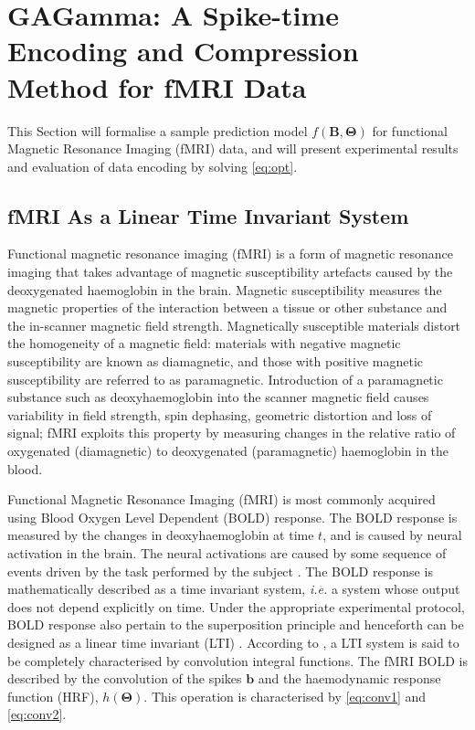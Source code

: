 \section{GAGamma: A Spike-time Encoding and Compression Method for fMRI Data}
\label{sec:fmri}

This Section will formalise a sample prediction model $f(\mathbf{B, \Theta})$ for functional Magnetic Resonance Imaging (fMRI) data, and will present experimental results and evaluation of data encoding by solving \equationname \ref{eq:opt}.

\subsection{fMRI As a Linear Time Invariant System}

Functional magnetic resonance imaging (fMRI) is a form of magnetic resonance imaging that takes advantage of magnetic susceptibility artefacts caused by the deoxygenated haemoglobin in the brain. Magnetic susceptibility measures the magnetic properties of the interaction between a tissue or other substance and the in-scanner magnetic field strength. Magnetically susceptible materials distort the homogeneity of a magnetic field: materials with negative magnetic susceptibility are known as diamagnetic, and those with positive magnetic susceptibility are referred to as paramagnetic. Introduction of a paramagnetic substance such as deoxyhaemoglobin into the scanner magnetic field causes variability in field strength, spin dephasing, geometric distortion and loss of signal; fMRI exploits this property by measuring changes in the relative ratio of oxygenated (diamagnetic) to deoxygenated (paramagnetic) haemoglobin in the blood.

Functional Magnetic Resonance Imaging (fMRI) is most commonly acquired using Blood Oxygen Level Dependent (BOLD) response. The BOLD response is measured by the changes in deoxyhaemoglobin at time $t$, and is caused by neural activation in the brain. The neural activations are caused by some sequence of events driven by the task performed by the subject \citep{friston1995analysis}. The BOLD response is mathematically described as a time invariant system, \emph{i.e.} a system whose output does not depend explicitly on time. Under the appropriate experimental protocol, BOLD response also pertain to the superposition principle and henceforth can be designed as a linear time invariant (LTI) \citep{vazquez1998nonlinear}. According to \citet{chen1995linear}, a LTI system is said to be completely characterised by convolution integral functions. The fMRI BOLD is described by the convolution of the spikes $\mathbf{b}$ and the haemodynamic response function (HRF), $h(\mathbf{\Theta})$. This operation is characterised by \equationnames \ref{eq:conv1} and \ref{eq:conv2}. 


